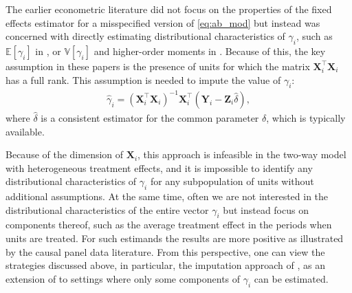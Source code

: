 \documentclass[letterpaper,12pt,leqno]{article}
\begin{document}
The earlier econometric literature did not focus on the properties of the fixed effects estimator for a misspecified version of \eqref{eq:ab_mod} but instead was concerned with directly estimating distributional characteristics of $\gamma_i$, such as $\mathbb{E}[\gamma_i]$ in \citep{chamberlain1992efficiency,graham2012identification}, or $\mathbb{V}[\gamma_i]$ and higher-order moments in \citep{arellano2011identifying}. Because of this, the key assumption in these papers is the presence of units for which the matrix $\mathbf{X}_{i}^\top \mathbf{X}_i$ has a full rank. This assumption is needed to impute the value of $\gamma_i$:
\begin{align*}
    \hat \gamma_i = \left(\mathbf{X}_{i}^\top \mathbf{X}_i\right)^{-1}\mathbf{X}_i^\top(\mathbf{Y}_i - \mathbf{Z}_i \hat\delta),
\end{align*}
where $\hat \delta$ is a consistent estimator for the common parameter $\delta$, which is typically available. 

Because of the dimension of $\mathbf{X}_i$, this approach is infeasible in the two-way model with heterogeneous treatment effects, and it is impossible to identify any distributional characteristics of $\gamma_i$ for any subpopulation of units without additional assumptions. At the same time, often we are not interested in the distributional characteristics of the entire vector $\gamma_i$ but instead focus on components thereof, such as the average treatment effect in the periods when units are treated. For such estimands the results are  more positive as illustrated by the causal panel data literature. From this perspective, one can view the strategies discussed above, in particular, the imputation approach of \citep{borusyak2021revisiting}, as an extension of \citep{arellano2011identifying} to settings where only some components of $\gamma_i$ can be estimated.
\end{document}
